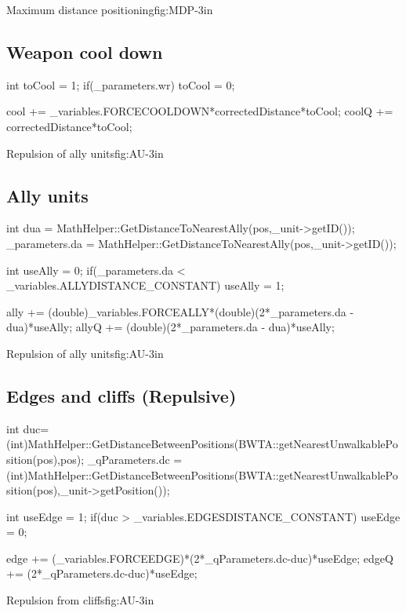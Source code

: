 			{Maximum distance positioning}{fig:MDP}{-3in}

	\subsection{Weapon cool down}
		\begin{Sourcecode}[caption=Weapon cool down]
int toCool = 1;
if(_parameters.wr)
	toCool = 0;
	
cool += _variables.FORCECOOLDOWN*correctedDistance*toCool;
coolQ += correctedDistance*toCool;
\end{Sourcecode}	
		{Repulsion of ally units}{fig:AU}{-3in}

	\subsection{Ally units}
	
	
		\begin{Sourcecode}[caption=Ally units]
int dua = MathHelper::GetDistanceToNearestAlly(pos,_unit->getID());
_parameters.da = MathHelper::GetDistanceToNearestAlly(pos,_unit->getID());

int useAlly = 0;
if(_parameters.da < _variables.ALLYDISTANCE_CONSTANT)
	useAlly = 1;
	

ally += (double)_variables.FORCEALLY*(double)(2*_parameters.da - dua)*useAlly;
allyQ += (double)(2*_parameters.da - dua)*useAlly;
\end{Sourcecode}	
			{Repulsion of ally units}{fig:AU}{-3in}

	\subsection{Edges and cliffs (Repulsive)}
	\begin{Sourcecode}[caption=Edges and cliffs]
int duc= (int)MathHelper::GetDistanceBetweenPositions(BWTA::getNearestUnwalkablePosition(pos),pos);
_qParameters.dc = (int)MathHelper::GetDistanceBetweenPositions(BWTA::getNearestUnwalkablePosition(pos),_unit->getPosition());

int useEdge = 1;
if(duc > _variables.EDGESDISTANCE_CONSTANT)
	useEdge = 0;

edge += (_variables.FORCEEDGE)*(2*_qParameters.dc-duc)*useEdge;
edgeQ += (2*_qParameters.dc-duc)*useEdge;
\end{Sourcecode}	



			{Repulsion from cliffs}{fig:AU}{-3in}